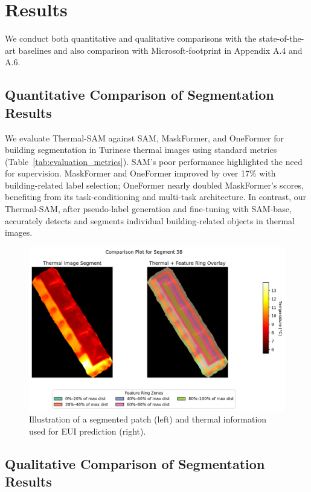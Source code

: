 \documentclass{article}
\theoremstyle{plain}
\theoremstyle{definition}
\theoremstyle{remark}
\begin{document}
\section{Results}

We conduct both quantitative and qualitative comparisons with the state-of-the-art baselines and also comparison with Microsoft-footprint in Appendix A.4 and A.6.

\subsection{Quantitative Comparison of Segmentation Results}
We evaluate Thermal-SAM against SAM, MaskFormer, and OneFormer for building segmentation in Turinese thermal images using standard metrics (Table~\ref{tab:evaluation_metrics}). SAM's poor performance highlighted the need for supervision. MaskFormer and OneFormer improved by over 17\% with building-related label selection; OneFormer nearly doubled MaskFormer's scores, benefiting from its task-conditioning and multi-task architecture. In contrast, our Thermal-SAM, after pseudo-label generation and fine-tuning with SAM-base, accurately detects and segments individual building-related objects in thermal images.

\begin{figure}[htbp]
\centering
\includegraphics[height=0.6\linewidth]{figs/comparison_overlay_38.pdf}
\caption{Illustration of a segmented patch (left) and thermal information used for EUI prediction (right). }
\label{fig:eui}
\end{figure}

\subsection{Qualitative Comparison of Segmentation Results} 
\end{document}
